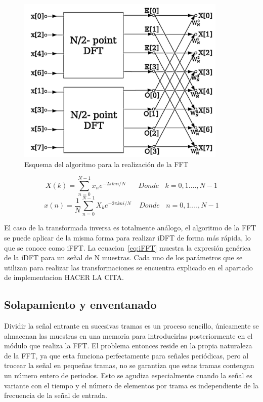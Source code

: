 \begin{figure}[!ht]
\begin{center}
\includegraphics[width=10cm]{img/dft.png}
\caption{\label{fig:fft}Esquema del algoritmo para la realización de la FFT}
\end{center}
\end{figure}

\begin{equation}
\label{eq:FFT}
X(k) =  \sum_{n = 0}^{N - 1} x_{n}e^{-2\pi kni/N}~~~~~~~~Donde~~~~k = 0, 1...., N-1
\end{equation}
\begin{equation}
\label{eq:iFFT}
x(n) = \frac{1}{N} \sum_{n = 0}^{N - 1} X_{k}e^{-2\pi kni/N}~~~~~Donde~~~~n = 0, 1...., N-1
\end{equation}

El caso de la transformada inversa es totalmente análogo, el algoritmo de la FFT se puede aplicar de la misma forma para realizar iDFT de forma más rápida, lo que se conoce como iFFT. La ecuacion~\ref{eq:iFFT} muestra la expresión genérica de la iDFT para un señal de N muestras. Cada uno de los parámetros que se utilizan para realizar las transformaciones se encuentra explicado en el apartado de implementacion HACER LA CITA.

\subsection{Solapamiento y enventanado}

Dividir la señal entrante en sucesivas tramas es un proceso sencillo, únicamente se almacenan las muestras en una memoria para introducirlas posteriormente en el módulo que realiza la FFT. El problema entonces reside en la propia naturaleza de la FFT, ya que esta funciona perfectamente para señales periódicas, pero al trocear la señal en pequeñas tramas, no se garantiza que estas tramas contengan un número entero de periodos. Esto se agudiza especialmente cuando la señal es variante con el tiempo y el número de elementos por trama es independiente de la frecuencia de la señal de entrada.

